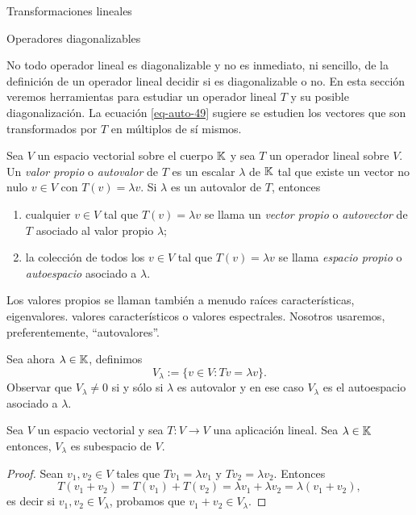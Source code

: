 \begin{chapter}{Transformaciones lineales}
\begin{section}{Operadores diagonalizables}
        
        No todo operador lineal es diagonalizable y no es inmediato, ni sencillo, de la definición de un operador lineal decidir si es diagonalizable o no. En esta sección veremos herramientas para estudiar un operador lineal $T$ y su posible diagonalización. La ecuación \eqref{eq-auto-49} sugiere se estudien los vectores que son transformados por $T$ en múltiplos de sí mismos.
        
        \begin{definicion}
            Sea $V$ un espacio vectorial sobre el cuerpo $\mathbb K$ y sea $T$ un operador lineal sobre $V$. Un \textit{valor propio} o \textit{autovalor} de $T$ es un escalar $\lambda$ de $\mathbb K$ tal que existe un vector no nulo $v \in V$ con $T(v) = \lambda v$. Si $\lambda$ es un autovalor de $T$, entonces
            \begin{enumerate}
                \item  cualquier  $v \in V$ tal que $T(v) = \lambda v$  se llama un \textit{vector propio} o  \textit{autovector} de $T$ asociado al valor propio $\lambda$;
                \item la colección de todos los $v \in V$ tal que $T(v) = \lambda v$  se llama \textit{espacio propio} o \textit{autoespacio} 	asociado a $\lambda$. 
            \end{enumerate}
            
            Los valores propios se llaman también a menudo raíces características, eigenvalores. valores característicos o valores espectrales. Nosotros usaremos, preferentemente, ``autovalores''.
            
            Sea ahora $\lambda \in \mathbb K$, definimos
            $$
            V_\lambda := \{v \in V: Tv = \lambda v \}.
            $$
            Observar que $V_\lambda \ne 0$ si y sólo si $\lambda$ es autovalor y en ese caso $V_\lambda$  es el autoespacio asociado a $\lambda$. 
        \end{definicion}
        
        
        \begin{teorema}
            Sea $V$ un espacio vectorial y sea $T:V \to V$ una aplicación lineal. Sea $\lambda \in \mathbb K$ entonces, $V_\lambda$  es subespacio de $V$.
        \end{teorema}
        \begin{proof}
            Sean $v_1,v_2 \in V$ tales que $Tv_1 = \lambda v_1$ y $Tv_2 = \lambda v_2$. Entonces
            $$
            T(v_1+v_2) = T(v_1)+ T(v_2) = \lambda v_1 + \lambda v_2 = \lambda (v_1 + v_2),
            $$
            es decir si  $v_1,v_2 \in V_\lambda$, probamos que $v_1+v_2 \in V_\lambda$. 
            

\end{proof}
\end{section}
\end{chapter}
